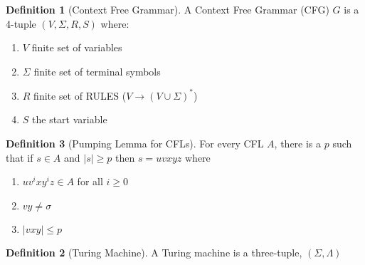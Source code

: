 \documentclass{article}
\theoremstyle{definition}
\newtheorem{definition}{Definition}[section]
\theoremstyle{theorem}
\theoremstyle{remark}
\begin{document}
\begin{definition}[Context Free Grammar]
    A Context Free Grammar (CFG) $G$ is a 4-tuple $(V, \Sigma, R, S)$ where:
    \begin{enumerate}
        \item  $V$ finite set of variables
        \item  $\Sigma$ finite set of terminal symbols
        \item  $R$ finite set of RULES ($V \rightarrow (V \cup \Sigma)^{*}$)
        \item  $S$ the start variable
    \end{enumerate}
\end{definition}


\begin{definition}[Pumping Lemma for CFLs]
    For every CFL $A$, there is a $p$ such that if $s \in A$ and $|s| \geq p$ then $s = uvxyz$ where
    \begin{enumerate}
        \item $uv^ixy^iz \in A$ for all $i \geq 0$
        \item $vy \neq \sigma$
        \item $|vxy| \leq p$
    \end{enumerate}

\begin{definition}[Turing Machine]
A Turing machine is a three-tuple, $(\Sigma, \Lambda)$
\end{definition}

\end{definition}
\end{document}
